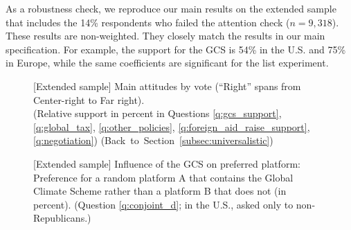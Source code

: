 As a robustness check, we reproduce our main results on the extended sample that includes the 14\% respondents who failed the attention check ($n = 9,318$). These results are non-weighted. They closely match the results in our main specification. For example, the support for the GCS is 54\% in the U.S. and 75\% in Europe, while the same coefficients are significant for the list experiment. %

\begin{figure}[h!] 
    \caption[(Extended sample) Main attitudes by vote]{[Extended sample] Main attitudes by vote (``Right'' spans from Center-right to Far right). \\ (Relative support in percent in Questions \ref{q:gcs_support}, \ref{q:global_tax}, \ref{q:other_policies}, \ref{q:foreign_aid_raise_support}, \ref{q:negotiation}) \hfill (Back~to~Section~\ref{subsec:universalistic})}\label{fig:main_by_vote_alla}
\end{figure}

\begin{figure}[h!]
    \caption[(Extended sample) Influence of the GCS on preferred platform]{[Extended sample] Influence of the GCS on preferred platform:\\ Preference for a random platform A that contains the Global Climate Scheme rather than a platform B that does not (in percent). (Question \ref{q:conjoint_d}; in the U.S., asked only to non-Republicans.)}\label{fig:conjoint_left_ag_b_alla}
\end{figure}

